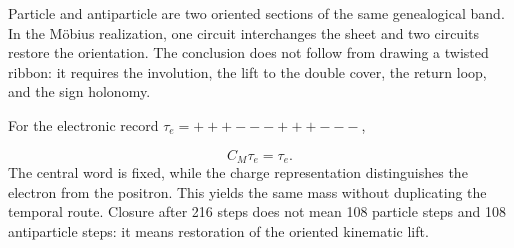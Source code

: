 Particle and antiparticle are two oriented sections of the same genealogical band. In the Möbius realization, one circuit interchanges the sheet and two circuits restore the orientation. The conclusion does not follow from drawing a twisted ribbon: it requires the involution, the lift to the double cover, the return loop, and the sign holonomy.

For the electronic record \(\tau_e=+++---+++---\),

\[
C_M\tau_e=\tau_e.
\]
The central word is fixed, while the charge representation distinguishes the electron from the positron. This yields the same mass without duplicating the temporal route. Closure after 216 steps does not mean 108 particle steps and 108 antiparticle steps: it means restoration of the oriented kinematic lift.

